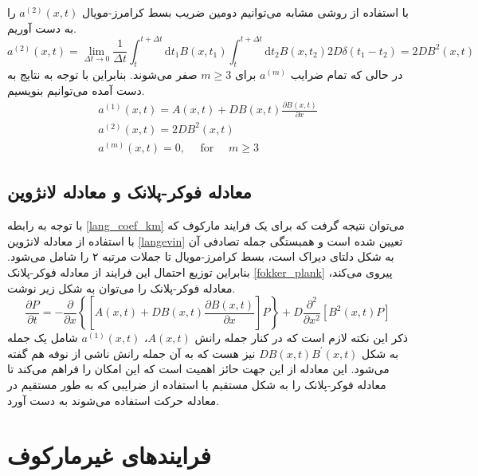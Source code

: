 با استفاده از روشی مشابه می‌توانیم دومین ضریب بسط کرامرز-مویال $a^{(2)}(x,t)$ را به دست آوریم.
$$
a^{(2)}(x, t)=\lim _{\Delta t \rightarrow 0} \frac{1}{\Delta t} \int_{t}^{t+\Delta t} \mathrm{d} t_{1} B\left(x, t_{1}\right) \int_{t}^{t+\Delta t} \mathrm{d} t_{2} B\left(x, t_{2}\right) 2 D \delta\left(t_{1}-t_{2}\right)=2 D B^{2}(x, t)
$$
در حالی که تمام ضرایب $a^{(m)}$ برای $m \geq 3$ صفر می‌شوند. بنابراین با توجه به نتایج به دست آمده می‌توانیم بنویسیم.
\begin{equation}
\begin{array}{l}{a^{(1)}(x, t)=A(x, t)+D B(x, t) \frac{\partial B(x, t)}{\partial x}} \\ {a^{(2)}(x, t)=2 D B^{2}(x, t)} \\ {a^{(m)}(x, t)=0, \quad \text { for } \quad m \geq 3}\end{array}
  \label{lang_coef_km}
\end{equation}

\subsection{معادله فوکر-پلانک و معادله لانژوین}

با توجه به رابطه \ref{lang_coef_km} می‌توان نتیجه گرفت که برای یک فرایند مارکوف که با استفاده از معادله لانژوین \ref{langevin} تعیین شده است و همبستگی جمله تصادفی آن به شکل دلتای دیراک است، بسط کرامرز-مویال تا جملات مرتبه ۲ را شامل می‌شود. بنابراین توزیع احتمال این فرایند از معادله فوکر-پلانک \ref{fokker_plank} پیروی می‌کند، معادله فوکر-پلانک را می‌توان به شکل زیر نوشت.
\begin{equation}
  \frac{\partial P}{\partial t}=-\frac{\partial}{\partial x}\left\{\left[A(x, t)+D B(x, t) \frac{\partial B(x, t)}{\partial x}\right] P\right\}+D \frac{\partial^{2}}{\partial x^{2}}\left[B^{2}(x, t) P\right]
\end{equation}
ذکر این نکته لازم است که در کنار جمله رانش $A(x,t)$، $a^{(1)}(x,t)$ شامل یک جمله به شکل $DB(x,t)B^{\prime}(x,t)$ نیز هست که به آن جمله رانش ناشی از نوفه هم گفته می‌شود. این معادله از این جهت حائز اهمیت است که این امکان را فراهم می‌کند تا معادله فوکر-پلانک را به شکل مستقیم با استفاده از ضرایبی که به طور مستقیم در معادله حرکت استفاده می‌شوند به دست آورد.\cite{2007cond.mat..1242G}

\section{فرایندهای غیرمارکوف}

